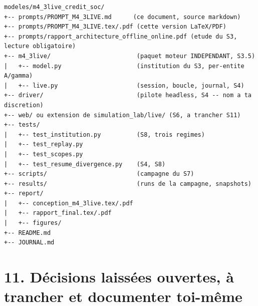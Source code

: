 \documentclass[11pt,a4paper]{article}
\begin{document}
\begin{verbatim}
modeles/m4_3live_credit_soc/
+-- prompts/PROMPT_M4_3LIVE.md      (ce document, source markdown)
+-- prompts/PROMPT_M4_3LIVE.tex/.pdf (cette version LaTeX/PDF)
+-- prompts/rapport_architecture_offline_online.pdf (etude du S3, lecture obligatoire)
+-- m4_3live/                        (paquet moteur INDEPENDANT, S3.5)
|   +-- model.py                     (institution du S3, per-entite A/gamma)
|   +-- live.py                      (session, boucle, journal, S4)
+-- driver/                          (pilote headless, S4 -- nom a ta discretion)
+-- web/ ou extension de simulation_lab/live/ (S6, a trancher S11)
+-- tests/
|   +-- test_institution.py          (S8, trois regimes)
|   +-- test_replay.py
|   +-- test_scopes.py
|   +-- test_resume_divergence.py    (S4, S8)
+-- scripts/                         (campagne du S7)
+-- results/                         (runs de la campagne, snapshots)
+-- report/
|   +-- conception_m4_3live.tex/.pdf
|   +-- rapport_final.tex/.pdf
|   +-- figures/
+-- README.md
+-- JOURNAL.md
\end{verbatim}

\section*{11. Décisions laissées ouvertes, à trancher et documenter toi-même}
\end{document}
